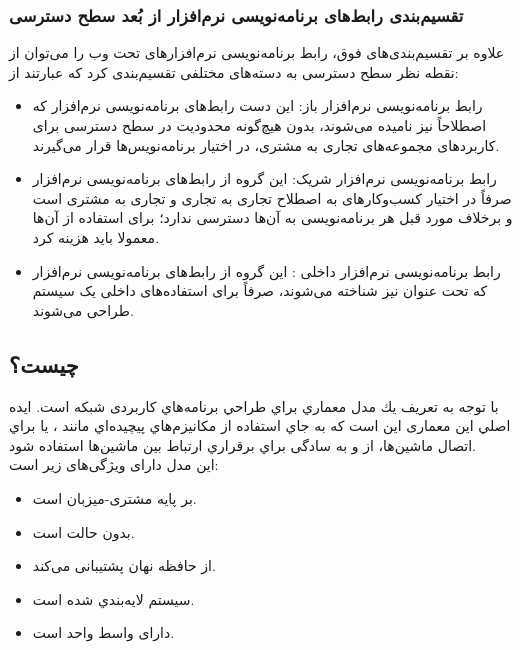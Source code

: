 {\subsubsection{تقسیم‌بندی رابط‌های برنامه‌نویسی نرم‌افزار از بُعد سطح دسترسی}
علاوه بر تقسیم‌بندی‌های فوق،‌ رابط برنامه‌نویسی نرم‌افزارهای تحت وب را می‌توان از نقطه نظر سطح دسترسی به دسته‌های مختلفی تقسیم‌بندی کرد که عبارتند از:
\begin{itemize}
	\item رابط برنامه‌نویسی نرم‌افزار باز: این دست رابط‌های برنامه‌نویسی نرم‌افزار که اصطلاحاً  نیز نامیده می‌شوند، بدون هیچ‌گونه محدودیت در سطح دسترسی برای کاربردهای مجموعه‌های تجاری به مشتری، در اختیار برنامه‌نویس‌ها قرار می‌گیرند.
	\item رابط برنامه‌نویسی نرم‌افزار شریک: این گروه از رابط‌های برنامه‌نویسی نرم‌افزار صرفاً در اختیار کسب‌وکارهای به اصطلاح تجاری به تجاری و تجاری به مشتری است و برخلاف مورد قبل هر برنامه‌نویسی به آن‌ها دسترسی ندارد؛ برای استفاده از آن‌ها معمولا باید هزینه کرد.
	\item رابط برنامه‌نویسی نرم‌افزار داخلی : این گروه از رابط‌های برنامه‌نویسی نرم‌افزار که تحت عنوان  نیز شناخته می‌شوند، صرفاً برای استفاده‌های داخلی یک سیستم طراحی می‌شوند.

\end{itemize}

\subsection{ چیست؟}
با توجه به تعریف
 يك مدل معماري براي طراحي برنامه‌هاي كاربردی شبكه است. ايده اصلي این معماری اين است كه به جاي استفاده از مكانيزم‌هاي پيچيده‌اي مانند ،  يا  براي اتصال ماشين‌ها، از  و به سادگی براي برقراري ارتباط بين ماشين‌ها استفاده شود.\\
این مدل دارای ویژگی‌های زیر است: 
\begin{itemize}
	\item بر پایه مشتری-میزبان است.
	\item بدون حالت است.
	\item از حافظه نهان پشتیبانی می‌کند.
	\item سيستم لايه‌بندي شده است.
    \item دارای واسط واحد است.
\end{itemize}
 
}
